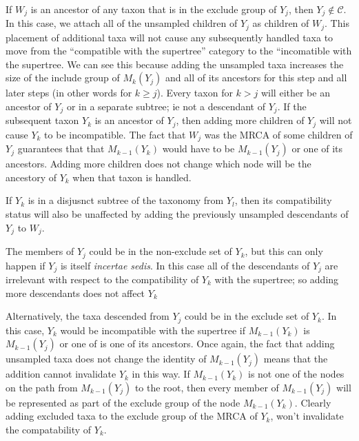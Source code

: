 \documentclass[english]{article}
\newcommand{\incsed}[0]{{\em incertae sedis}\xspace}
\begin{document}
\\
If $W_j$ is an ancestor of any taxon that is in the exclude group of $Y_j$, then $Y_j\notin\mathcal{C}$.
In this case, we attach all of the unsampled children of $Y_j$ as children of $W_j$.
This placement of additional taxa will not cause any subsequently handled taxa to move from
    the ``compatible with the supertree'' category to the ``incomatible with the supertree.
We can see this because adding the unsampled taxa increases the size of the include group
    of $M_{k}(Y_j)$ and all of its ancestors for this step and all later steps (in other words
    for $k \geq j$).
Every taxon for $k>j$ will either be an ancestor of $Y_j$ or in a separate subtree; ie not a descendant of $Y_j$.
If the subsequent taxon $Y_k$ is an ancestor of $Y_j$, then adding more children of $Y_j$ will not cause $Y_k$ to be incompatible.
The fact that $W_j$ was the MRCA of some children of $Y_j$ guarantees that that $M_{k-1}(Y_k)$
    would have to be $M_{k-1}(Y_j)$ or one of its ancestors.
Adding more children does not change which node will be the ancestory of $Y_k$ when that taxon is handled.

If $Y_k$ is in a disjusnct subtree of the taxonomy from $Y_l$, then its compatibility 
status will also be unaffected by adding the previously unsampled descendants of
$Y_j$ to $W_j$.

The members of $Y_j$ could be in the non-exclude set of $Y_k$, but this can only happen if
    $Y_j$ is itself \incsed.
In this case all of the descendants of $Y_j$ are irrelevant with respect to the compatibility
    of $Y_k$ with the supertree; so adding more descendants does not affect $Y_k$

Alternatively, the taxa descended from $Y_j$ could be in the exclude set of $Y_k$.
In this case, $Y_k$ would be incompatible with the supertree if $M_{k-1}(Y_k)$ is
    $M_{k-1}(Y_j)$ or one of is one of its ancestors.
Once again, the fact that adding unsampled taxa does not change the identity of $M_{k-1}(Y_j)$
    means that the addition cannot invalidate $Y_k$ in this way.
If $M_{k-1}(Y_k)$ is not one of the nodes on the path from $M_{k-1}(Y_j)$ to the root, then
    every member of $M_{k-1}(Y_j)$ will be represented as part of the exclude group
    of the node $M_{k-1}(Y_k)$.
Clearly adding excluded taxa to the exclude group of the MRCA of $Y_k$, won't invalidate the 
compatability of $Y_k$. 
\end{document}
